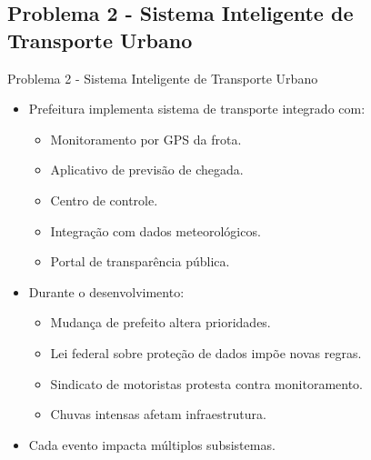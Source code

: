 \documentclass{beamer}
\begin{document}
\subsection{Problema 2 - Sistema Inteligente de Transporte Urbano}

\begin{frame}{Problema 2 - Sistema Inteligente de Transporte Urbano}
	\begin{itemize}
		\justifying
		\item Prefeitura implementa sistema de transporte integrado com:
			\begin{itemize}
				\item Monitoramento por GPS da frota.
				\item Aplicativo de previsão de chegada.
				\item Centro de controle.
				\item Integração com dados meteorológicos.
				\item Portal de transparência pública.
			\end{itemize}
		\item Durante o desenvolvimento:
			\begin{itemize}
				\item Mudança de prefeito altera prioridades.
				\item Lei federal sobre proteção de dados impõe novas regras.
				\item Sindicato de motoristas protesta contra monitoramento.
				\item Chuvas intensas afetam infraestrutura.
			\end{itemize}
		\item Cada evento impacta múltiplos subsistemas.
	\end{itemize}
\end{frame}
\end{document}
